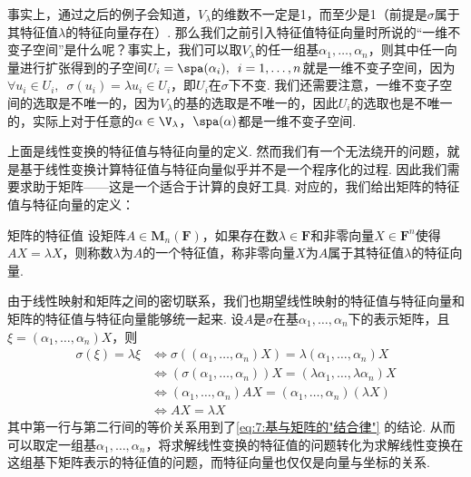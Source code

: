 事实上，通过之后的例子会知道，$V_\lambda$的维数不一定是1，而至少是1（前提是$\sigma$属于其特征值$\lambda$的特征向量存在）. 那么我们之前引入特征值特征向量时所说的``一维不变子空间''是什么呢？事实上，我们可以取$V_\lambda$的任一组基$\alpha_1,\ldots,\alpha_n$，则其中任一向量进行扩张得到的子空间$U_i=\spa(\alpha_i),\enspace i=1,\ldots,n$就是一维不变子空间，因为$\forall u_i\in U_i,\enspace \sigma(u_i)=\lambda u_i\in U_i$，即$U_i$在$\sigma$下不变. 我们还需要注意，一维不变子空间的选取是不唯一的，因为$V_\lambda$的基的选取是不唯一的，因此$U_i$的选取也是不唯一的，实际上对于任意的$\alpha\in\V_{\lambda}$，$\spa(\alpha)$都是一维不变子空间.

上面是线性变换的特征值与特征向量的定义. 然而我们有一个无法绕开的问题，就是基于线性变换计算特征值与特征向量似乎并不是一个程序化的过程. 因此我们需要求助于矩阵——这是一个适合于计算的良好工具. 对应的，我们给出矩阵的特征值与特征向量的定义：
\begin{definition}{}{矩阵的特征值}
    设矩阵$A\in \mathbf{M}_n(\mathbf{F})$，如果存在数$\lambda\in\mathbf{F}$和非零向量$X\in\mathbf{F}^n$使得$AX=\lambda X$，则称数$\lambda$为$A$的一个特征值，称非零向量$X$为$A$属于其特征值$\lambda$的特征向量.
\end{definition}

由于线性映射和矩阵之间的密切联系，我们也期望线性映射的特征值与特征向量和矩阵的特征值与特征向量能够统一起来. 设$A$是$\sigma$在基$\alpha_1,\ldots,\alpha_n$下的表示矩阵，且$\xi=(\alpha_1,\ldots,\alpha_n)X$，则
\begin{align*}
    \sigma(\xi)=\lambda\xi & \iff \sigma((\alpha_1,\ldots,\alpha_n)X)=\lambda(\alpha_1,\ldots,\alpha_n)X        \\
                           & \iff (\sigma(\alpha_1,\ldots,\alpha_n))X=(\lambda\alpha_1,\ldots,\lambda\alpha_n)X \\
                           & \iff (\alpha_1,\ldots,\alpha_n)AX=(\alpha_1,\ldots,\alpha_n)(\lambda X)            \\
                           & \iff AX=\lambda X
\end{align*}
其中第一行与第二行间的等价关系用到了\autoref{eq:7:基与矩阵的"结合律"} 的结论. 从而可以取定一组基$\alpha_1,\ldots,\alpha_n$，将求解线性变换的特征值的问题转化为求解线性变换在这组基下矩阵表示的特征值的问题，而特征向量也仅仅是向量与坐标的关系.

